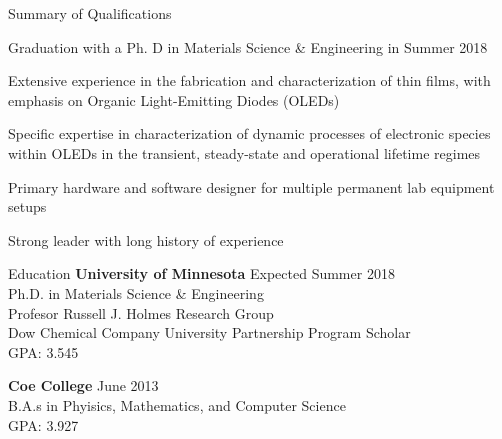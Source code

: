 \documentclass{resume} %
\begin{document}

\begin{rSection}{Summary of Qualifications}
\item Graduation with a Ph. D in Materials Science \& Engineering in Summer 2018
\item Extensive experience in the fabrication and characterization of thin films, with emphasis on Organic Light-Emitting Diodes (OLEDs)
\item Specific expertise in characterization of dynamic processes of electronic species within OLEDs in the transient, steady-state and operational lifetime regimes
\item Primary hardware and software designer for multiple permanent lab equipment setups 
\item Strong leader with long history of experience


\end{rSection}


\begin{rSection}{Education}
{\bf University of Minnesota} \hfill { Expected Summer 2018} \\
Ph.D. in Materials Science \& Engineering \\
Profesor Russell J. Holmes Research Group \\
Dow Chemical Company University Partnership Program Scholar \\
GPA: 3.545

{\bf Coe College} \hfill { June 2013} \\ 
B.A.s in Phyisics, Mathematics, and Computer Science\\
GPA: 3.927 

\end{rSection}

\end{document}
